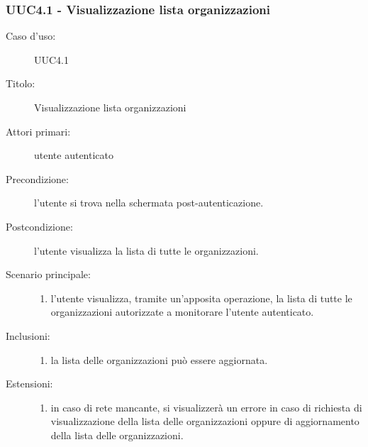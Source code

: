 \documentclass[casi-duso]{subfiles}
\begin{document}
\subsubsection{UUC4.1 - Visualizzazione lista organizzazioni}%
\label{subsub:UUC4.1utente}
\begin{description}
  \item[Caso d’uso:] UUC4.1
  \item[Titolo:] Visualizzazione lista organizzazioni
  \item[Attori primari:] utente autenticato
  \item[Precondizione:] l'utente si trova nella schermata post-autenticazione.
  \item[Postcondizione:] l'utente visualizza la lista di tutte le organizzazioni.
  \item[Scenario principale:]
        \begin{enumerate}
          \item l'utente visualizza, tramite un'apposita operazione, la lista di tutte le organizzazioni autorizzate a monitorare l'utente autenticato.
        \end{enumerate}
  \item[Inclusioni:]
        \begin{enumerate}
          \item la lista delle organizzazioni può essere aggiornata.
        \end{enumerate}
  \item[Estensioni:]
        \begin{enumerate}
          \item in caso di rete mancante, si visualizzerà un errore in caso di richiesta di visualizzazione della lista delle organizzazioni
                oppure di aggiornamento della lista delle organizzazioni.
        \end{enumerate}
\end{description}

\end{document}
